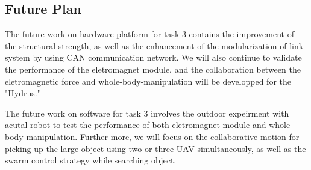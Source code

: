 \documentclass{standalone}
\begin{document}
\subsection{Future Plan}
The future work on hardware platform for task 3 contains the improvement of the structural strength, as well as the enhancement of the modularization of link system by using CAN communication network. We will also continue to validate the performance of the eletromagnet module, and the  collaboration between the eletromagnetic force and whole-body-manipulation will be developped for the "Hydrus."

The future work on software for task 3 involves the outdoor expeirment with acutal robot to test the performance of both eletromagnet module and whole-body-manipulation. Further more, we will focus on the collaborative motion for picking up the large object using two or three UAV simultaneously, as well as the swarm control strategy while searching object.
\end{document}
